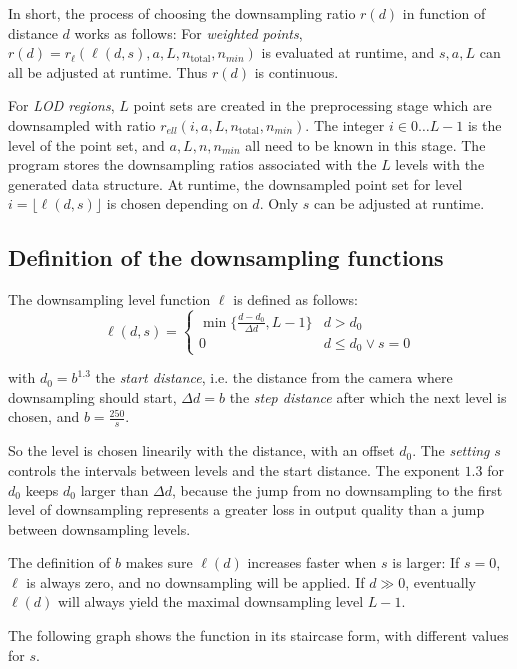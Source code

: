 \documentclass[a4paper,10pt,abstracton,notitlepage]{scrreprt}
\begin{document}
In short, the process of choosing the downsampling ratio $r(d)$ in function of distance $d$ works as follows: For \emph{weighted points}, $r(d) = r_{\ell}(\ell(d, s), a, L, n_{\text{total}}, n_{min})$ is evaluated at runtime, and $s, a, L$ can all be adjusted at runtime. Thus $r(d)$ is continuous.

For \emph{LOD regions}, $L$ point sets are created in the preprocessing stage which are downsampled with ratio $r_{ell}(i, a, L, n_{\text{total}}, n_{min})$. The integer $i \in 0 \hdots L-1$ is the level of the point set, and $a, L, n, n_{min}$ all need to be known in this stage. The program stores the downsampling ratios associated with the $L$ levels with the generated data structure. At runtime, the downsampled point set for level $i = \lfloor \ell(d, s) \rfloor$ is chosen depending on $d$. Only $s$ can be adjusted at runtime.

\subsection{Definition of the downsampling functions}
The downsampling level function $\ell$ is defined as follows:
\begin{displaymath}
	\ell(d, s) = \begin{cases}
		\min \{ \frac{d - d_{0}}{\Delta d}, L-1 \} & d > d_{0} \\
		0 & d \leq d_{0} \vee s = 0
	\end{cases}
\end{displaymath}

with $d_{0} = b^{1.3}$ the \emph{start distance}, i.e. the distance from the camera where downsampling should start, $\Delta d = b$ the \emph{step distance} after which the next level is chosen, and $b = \frac{250}{s}$.

So the level is chosen linearily with the distance, with an offset $d_{0}$. The \emph{setting} $s$ controls the intervals between levels and the start distance. The exponent $1.3$ for $d_{0}$ keeps $d_{0}$ larger than $\Delta d$, because the jump from no downsampling to the first level of downsampling represents a greater loss in output quality than a jump between downsampling levels.

The definition of $b$ makes sure $\ell(d)$ increases faster when $s$ is larger: If $s = 0$, $\ell$ is always zero, and no downsampling will be applied. If $d \gg 0$, eventually $\ell(d)$ will always yield the maximal downsampling level $L - 1$.

The following graph shows the function in its staircase form, with different values for $s$.
\end{document}
